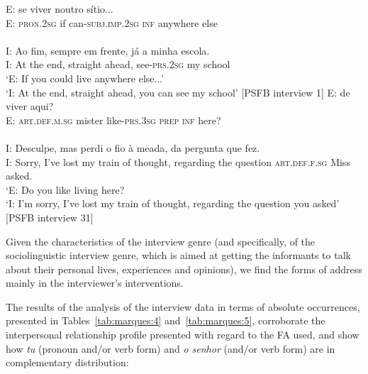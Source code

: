 \documentclass[output=paper]{langscibook}
\begin{document}
\ea \label{ex:marques:18}
\gll E:           se      viver noutro sítio...\\
        E: \textsc{pron.2sg}    if     can-\textsc{subj.imp.2sg}   \textsc{inf} anywhere else\\
        \\
\gll I: Ao fim,     sempre em frente, já    {}      {a minha} escola.\\
        I: At the end,  straight ahead, {} see-{\textsc{prs.2sg}}  my school\\
\glt ‘E: If you could live anywhere else...’\\
\glt ‘I: At the end, straight ahead, you can see my school’ [PSFB interview 1]
\ex \label{ex:marques:19}
\gll E:                       de     viver  aqui? \\
        E: \textsc{art.def.m.sg} mister         like-\textsc{prs.3sg} \textsc{prep}  \textsc{inf} here?\\
        \\
\gll I: Desculpe,  mas perdi {o fio à meada},     {da pergunta que}                               fez.\\
        I: Sorry,  {}    {I’ve lost} {my train of thought}, {regarding the question}  \textsc{art.def.f.sg}  Miss  asked.\\
\glt ‘E: Do you like living here?\\
\glt `I: I’m sorry, I’ve lost my train of thought, regarding the question you asked’ [PSFB interview 31]\\
\z 

Given the characteristics of the interview genre (and specifically, of the sociolinguistic interview genre, which is aimed at getting the informants to talk about their personal lives, experiences and opinions), we find the forms of address mainly in the interviewer’s interventions.



The results of the analysis of the interview data in terms of absolute occurrences, presented in Tables~\ref{tab:marques:4} and~\ref{tab:marques:5}, corroborate the interpersonal relationship profile presented with regard to the FA used, and show how \textit{tu} (pronoun and\slash or verb form) and \textit{o senhor} (and\slash or verb form) are in complementary distribution:
\end{document}
